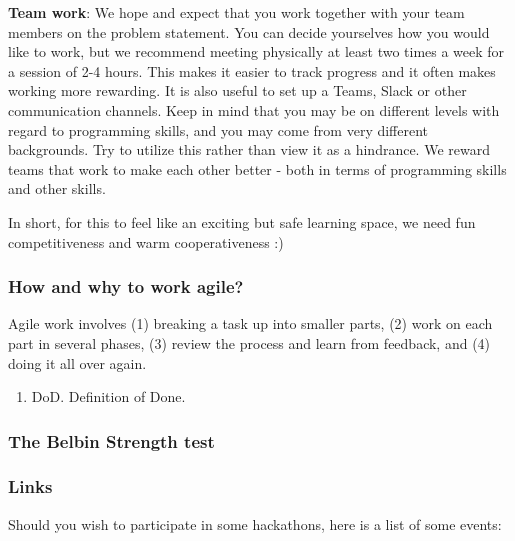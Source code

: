 \documentclass[
]{article}
\providecommand{\tightlist}{%
  \setlength{\itemsep}{0pt}\setlength{\parskip}{0pt}}
\begin{document}
\textbf{Team work}: We hope and expect that you work together with your
team members on the problem statement. You can decide yourselves how you
would like to work, but we recommend meeting physically at least two
times a week for a session of 2-4 hours. This makes it easier to track
progress and it often makes working more rewarding. It is also useful to
set up a Teams, Slack or other communication channels. Keep in mind that
you may be on different levels with regard to programming skills, and
you may come from very different backgrounds. Try to utilize this rather
than view it as a hindrance. We reward teams that work to make each
other better - both in terms of programming skills and other skills.

In short, for this to feel like an exciting but safe learning space, we
need fun competitiveness and warm cooperativeness :)

\hypertarget{how-and-why-to-work-agile}{%
\subsubsection{How and why to work
agile?}\label{how-and-why-to-work-agile}}

Agile work involves (1) breaking a task up into smaller parts, (2) work
on each part in several phases, (3) review the process and learn from
feedback, and (4) doing it all over again.

\begin{enumerate}
\def\labelenumi{\arabic{enumi}.}
\setcounter{enumi}{2}
\tightlist
\item
  DoD. Definition of Done.
\end{enumerate}

\hypertarget{the-belbin-strength-test}{%
\subsubsection{The Belbin Strength
test}\label{the-belbin-strength-test}}

\hypertarget{links}{%
\subsubsection{Links}\label{links}}

Should you wish to participate in some hackathons, here is a list of
some events:
\end{document}
